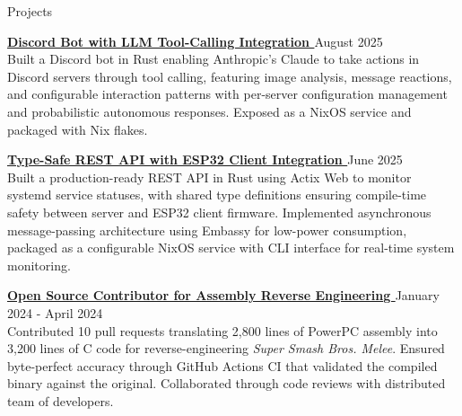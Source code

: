 \documentclass{resume}
\newcommand{\scaledfaExternalLink}{\raisebox{0.1\height}{\scalebox{0.7}{\faExternalLink*}}}
\begin{document}
\begin{rSection}{Projects}

\item{} {\bf{}
    \href{https://github.com/wyatt-avilla/claude-discord-bot}{Discord
  Bot with LLM Tool-Calling Integration \scaledfaExternalLink}}
  {\hfill{} August 2025} \\
  Built a Discord bot in Rust enabling Anthropic's Claude to take
  actions in Discord servers through tool calling, featuring image
  analysis, message reactions, and configurable interaction patterns
  with per-server configuration management and probabilistic
  autonomous responses. Exposed as a NixOS service and packaged with Nix flakes.

\item{} {\bf{} \href{https://github.com/wyatt-avilla/hypha}{Type-Safe
  REST API with ESP32 Client Integration \scaledfaExternalLink}}
  {\hfill{} June 2025} \\
  Built a production-ready REST API in Rust using Actix Web to
  monitor systemd service statuses, with shared type definitions
  ensuring compile-time safety between server and ESP32 client
  firmware. Implemented asynchronous message-passing architecture
  using Embassy for low-power consumption, packaged as a configurable
  NixOS service with CLI interface for real-time system monitoring.

\item{} {\bf{}
    \href{https://github.com/search?q=repo\%3Adoldecomp\%2Fmelee++author\%3Awyatt-avilla&type=pullrequests&ref=advsearch}{Open
      Source Contributor for
  Assembly Reverse Engineering \scaledfaExternalLink}} {\hfill{}
  January 2024 - April 2024} \\
  Contributed 10 pull requests translating 2,800 lines of PowerPC
  assembly into 3,200 lines of C code for reverse-engineering
  \textit{Super Smash Bros. Melee}. Ensured byte-perfect accuracy
  through GitHub Actions CI that validated the compiled binary
  against the original. Collaborated through code reviews with
  distributed team of developers.

\end{rSection}
\end{document}
